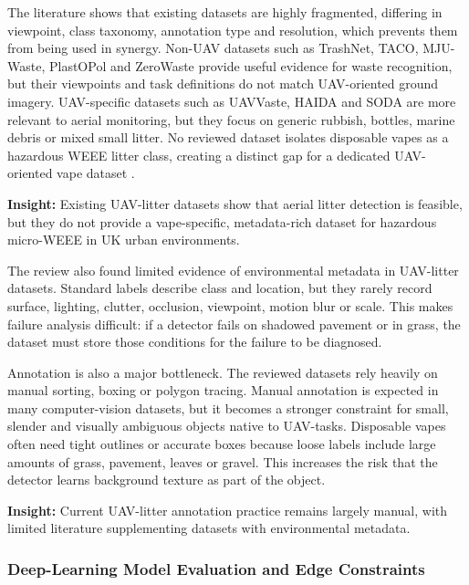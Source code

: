 The literature shows that existing datasets are highly fragmented, differing in viewpoint, class taxonomy, annotation type and resolution, which prevents them from being used in synergy. Non-UAV datasets such as TrashNet, TACO, MJU-Waste, PlastOPol and ZeroWaste provide useful evidence for waste recognition, but their viewpoints and task definitions do not match UAV-oriented ground imagery. UAV-specific datasets such as UAVVaste, HAIDA and SODA are more relevant to aerial monitoring, but they focus on generic rubbish, bottles, marine debris or mixed small litter. No reviewed dataset isolates disposable vapes as a hazardous WEEE litter class, creating a distinct gap for a dedicated UAV-oriented vape dataset \cite{bartolo2026litterreview}.

\vspace{0.5em}
\noindent\textbf{Insight:} Existing UAV-litter datasets show that aerial litter detection is feasible, but they do not provide a vape-specific, metadata-rich dataset for hazardous micro-WEEE in UK urban environments.

The review also found limited evidence of environmental metadata in UAV-litter datasets. Standard labels describe class and location, but they rarely record surface, lighting, clutter, occlusion, viewpoint, motion blur or scale. This makes failure analysis difficult: if a detector fails on shadowed pavement or in grass, the dataset must store those conditions for the failure to be diagnosed. 

Annotation is also a major bottleneck. The reviewed datasets rely heavily on manual sorting, boxing or polygon tracing. Manual annotation is expected in many computer-vision datasets, but it becomes a stronger constraint for small, slender and visually ambiguous objects native to UAV-tasks. Disposable vapes often need tight outlines or accurate boxes because loose labels include large amounts of grass, pavement, leaves or gravel. This increases the risk that the detector learns background texture as part of the object.

\vspace{0.5em}
\noindent\textbf{Insight:} Current UAV-litter annotation practice remains largely manual, with limited literature supplementing datasets with environmental metadata.

\subsubsection{Deep-Learning Model Evaluation and Edge Constraints}

